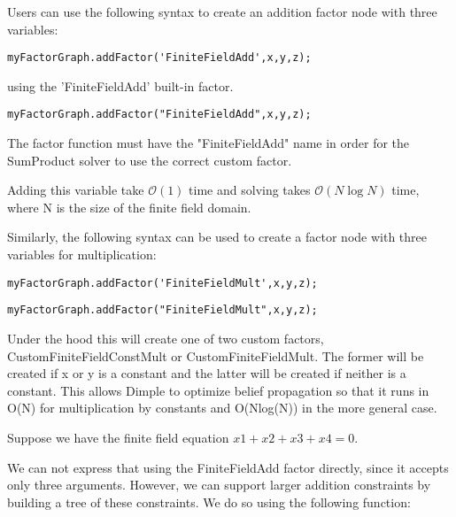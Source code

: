 \fi


Users can use the following syntax to create an addition factor node with three variables:

\ifmatlab
\begin{lstlisting}
myFactorGraph.addFactor('FiniteFieldAdd',x,y,z);
\end{lstlisting}

using the 'FiniteFieldAdd' built-in factor.
\fi

\ifjava
\begin{lstlisting}
myFactorGraph.addFactor("FiniteFieldAdd",x,y,z);
\end{lstlisting}

The factor function must have the "FiniteFieldAdd" name in order for the SumProduct solver to use the correct custom factor.
\fi

Adding this variable take $\mathcal{O}(1)$ time and solving takes $\mathcal{O}(N\log N)$ time, where N is the size of the finite field domain.


Similarly, the following syntax can be used to create a factor node with three variables for multiplication:

\ifmatlab
\begin{lstlisting}
myFactorGraph.addFactor('FiniteFieldMult',x,y,z);
\end{lstlisting}
\fi

\ifjava
\begin{lstlisting}
myFactorGraph.addFactor("FiniteFieldMult",x,y,z);
\end{lstlisting}
\fi

Under the hood this will create one of two custom factors, CustomFiniteFieldConstMult or CustomFiniteFieldMult. The former will be created if x or y is a constant and the latter will be created if neither is a constant. This allows Dimple to optimize belief propagation so that it runs in O(N) for multiplication by constants and O(Nlog(N)) in the more general case.

\ifmatlab


Suppose we have the finite field equation $ x1+x2+x3+x4=0 $.

We can not express that using the FiniteFieldAdd factor directly, since it accepts only three arguments. However, we can support larger addition constraints by building a tree of these constraints. We do so using the following function:

